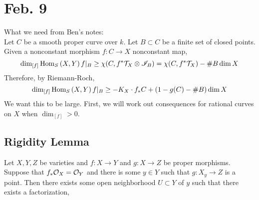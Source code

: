 \documentclass[12pt]{article}
\begin{document}
\section{Feb. 9}

What we need from Ben's notes:
\bigskip\\
Let $C$ be a smooth proper curve over $k$. Let $B \subset C$ be a finite set of closed points. Given a nonconstant morphism $f : C \to X$ nonconstant map,
\[ \dim_{[f]} \mathrm{Hom}_{S} \left( X, Y \right){f|_B} \ge \chi(C, f^* \mathcal{T}_X \otimes \mathscr{I}_B) = \chi(C, f^* \mathcal{T}_X) - \# B \dim{X} \]
Therefore, by Riemann-Roch,
\[ \dim_{[f]} \mathrm{Hom}_{S} \left( X, Y \right){f|_B} \ge -K_X \cdot f_* C + (1 - g(C) - \# B) \dim{X} \]
We want this to be large. First, we will work out consequences for rational curves on $X$ when $\dim_{[f]}  > 0$. 

\subsection{Rigidity Lemma}

\begin{lemma}
Let $X,Y,Z$ be varieties and $f : X \to Y$ and $g : X \to Z$ be proper morphisms. Suppose that $f_* \mathcal{O}_{X} = \mathcal{O}_{Y}$ and there is some $y \in Y$ such that $g : X_y \to Z$ is a point. Then there exists some open neighborhood $U \subset Y$ of $y$ such that there exists a factorization,
\begin{center}
\end{center}
\end{lemma}
\end{document}
